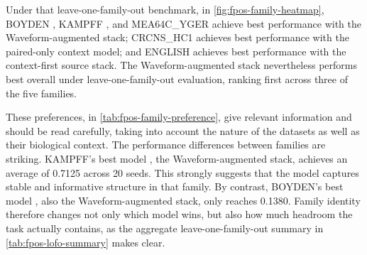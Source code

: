 Under that leave-one-family-out benchmark, in \cref{fig:fpos-family-heatmap}, BOYDEN \parencite{doi:10.1152/jn.00650.2017}, KAMPFF \parencite{Neto2016Paired}, and MEA64C\_YGER \parencite{10.7554/eLife.34518} achieve best performance with the Waveform-augmented stack; CRCNS\_HC1 \parencite{doi:10.1152/jn.2000.84.1.401} achieves best performance with the paired-only context model; and ENGLISH \parencite{Magland2020} achieves best performance with the context-first source stack. The Waveform-augmented stack nevertheless performs best overall under leave-one-family-out evaluation, ranking first across three of the five families.

\begin{table}[H]
    \centering
    \caption{Best leave-one-family-out \fpos{} average \rsq{} within the twenty-seed comparison across the five main compared models, with the corresponding standard deviation of \rsq{}, average \mae{}, and standard deviation of \mae{} reported for the same winning model-family pair.}
    \label{tab:fpos-family-preference}
    \small
\end{table}

These preferences, in \cref{tab:fpos-family-preference}, give relevant information and should be read carefully, taking into account the nature of the datasets as well as their biological context. The performance differences between families are striking. KAMPFF's best model \parencite{Neto2016Paired}, the Waveform-augmented stack, achieves an average \rsq{} of 0.7125 across 20 seeds. This strongly suggests that the model captures stable and informative structure in that family. By contrast, BOYDEN's best model \parencite{doi:10.1152/jn.00650.2017}, also the Waveform-augmented stack, only reaches 0.1380. Family identity therefore changes not only which model wins, but also how much headroom the task actually contains, as the aggregate leave-one-family-out summary in \cref{tab:fpos-lofo-summary} makes clear.

